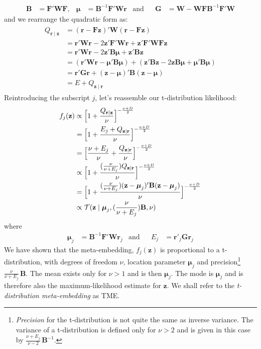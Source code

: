 \documentclass[a4paper,oneside,12pt,english]{report}
\def\zvec{\mathbf{z}}
\def\Bmat{\mathbf{B}}
\def\Wmat{\mathbf{W}}
\def\Fmat{\mathbf{F}}
\def\Gmat{\mathbf{G}}
\def\Gmat{\mathbf{G}}
\def\rvec{\mathbf{r}}
\def\muvec{\boldsymbol{\mu}}
\begin{document}
\begin{align}
\label{eq:defBmuG}
\Bmat &= \Fmat'\Wmat\Fmat,& \muvec &= \Bmat^{-1}\Fmat'\Wmat\rvec& \text{and} && \Gmat &= \Wmat-\Wmat\Fmat\Bmat^{-1}\Fmat'\Wmat 
\end{align}
and we rearrange the quadratic form as:
\begin{align}
\label{eq:rearrangeQ}
\begin{split}
Q_{\rvec\mid\zvec} &= (\rvec-\Fmat\zvec)'\Wmat(\rvec-\Fmat\zvec)\\ 
&= \rvec'\Wmat\rvec -2\zvec'\Fmat'\Wmat\rvec + \zvec'\Fmat'\Wmat\Fmat\zvec \\
&= \rvec'\Wmat\rvec -2\zvec'\Bmat\muvec + \zvec'\Bmat\zvec \\
&= (\rvec'\Wmat\rvec -\muvec'\Bmat\muvec) + (\zvec'\Bmat\zvec -2\zvec\Bmat\muvec + \muvec'\Bmat\muvec) \\
&= \rvec'\Gmat\rvec + (\zvec-\muvec)'\Bmat(\zvec-\muvec) \\
&= E + Q_{\zvec\mid\rvec}
\end{split}
\end{align}
Reintroducing the subscript $j$, let's reassemble our t-distribution likelihood:
\begin{align}
\label{eq:TME}
\begin{split}
f_j(\zvec) &\propto \Bigl[1+\frac{Q_{\rvec\mid\zvec}}{\nu}\Bigr]^{-\frac{\nu+D}{2}} \\
&= \Bigl[1+\frac{E_j + Q_{\zvec\mid\rvec}}{\nu}\Bigr]^{-\frac{\nu+D}{2}} \\
&= \Bigl[\frac{\nu+E_j}{\nu} + \frac{Q_{\zvec\mid\rvec}}{\nu}\Bigr]^{-\frac{\nu+D}{2}} \\
&\propto \Bigl[1 + \frac{(\frac{\nu}{\nu+E_j})Q_{\zvec\mid\rvec}}{\nu}\Bigr]^{-\frac{\nu+D}{2}} \\
&= \Bigl[1 + \frac{(\frac{\nu}{\nu+E_j})(\zvec-\muvec_j)'\Bmat(\zvec-\muvec_j)}{\nu}\Bigr]^{-\frac{\nu+D}{2}} \\
&\propto\TD(\zvec\mid \muvec_j,(\frac{\nu}{\nu+E_j})\Bmat,\nu)
\end{split}
\end{align}
where
\begin{align}
\muvec_j &= \Bmat^{-1}\Fmat'\Wmat\rvec_j &\text{and} &&
E_j &= \rvec'_j\Gmat\rvec_j
\end{align}
We have shown that the meta-embedding, $f_j(\zvec)$ is proportional to a t-distribution, with degrees of freedom $\nu$, location parameter $\muvec_j$ and precision\footnote{\emph{Precision} for the t-distribution is not quite the same as inverse variance. The variance of a t-distribution is defined only for $\nu>2$ and is given in this case by $\frac{\nu+E_j}{\nu-2}\,\Bmat^{-1}$.} $\frac{\nu}{\nu+E_j}\,\Bmat$. The mean exists only for $\nu>1$ and is then $\muvec_j$. The mode is $\muvec_j$ and is therefore also the maximum-likelihood estimate for $\zvec$. We shall refer to the \emph{t-distribution meta-embedding} as TME.
\end{document}
